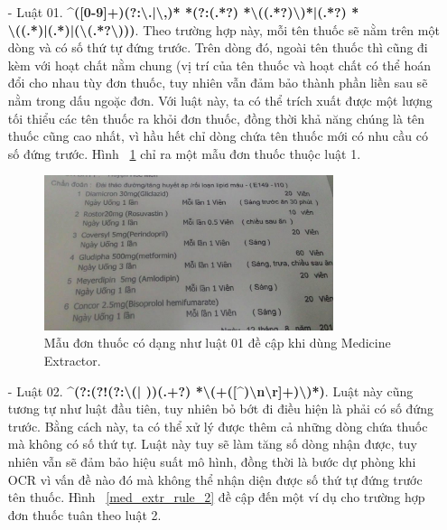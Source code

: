 \begin{itemize}

\item[-] Luật 01. \textbf{^([0-9]+)(?:\textbackslash.|\textbackslash,)* *(?:(.*?) *\textbackslash((.*?)\textbackslash)*|(.*?) *\\\textbackslash((.*)|(.*)|(\textbackslash(.*?\textbackslash)))}. Theo trường hợp này, mỗi tên thuốc sẽ nằm trên một dòng và có số thứ tự đứng trước. Trên dòng đó, ngoài tên thuốc thì cũng đi kèm với hoạt chất nằm chung (vị trí của tên thuốc và hoạt chất có thể hoán đổi cho nhau tùy đơn thuốc, tuy nhiên vẫn đảm bảo thành phần liền sau sẽ nằm trong dấu ngoặc đơn. Với luật này, ta có thể trích xuất được một lượng tối thiểu các tên thuốc ra khỏi đơn thuốc, đồng thời khả năng chúng là tên thuốc cũng cao nhất, vì hầu hết chỉ dòng chứa tên thuốc mới có nhu cầu có số đứng trước. Hình ~\ref{med_extr_rule_1} chỉ ra một mẫu đơn thuốc thuộc luật 1.

\begin{figure}
\centering
\includegraphics[width=0.8\textwidth]{mep_img/med_extr_rule_1.png}
\caption{Mẫu đơn thuốc có dạng như luật 01 đề cập khi dùng Medicine Extractor.}\label{med_extr_rule_1}
\end{figure}

\item[-] Luật 02. \textbf{^(?:(?!(?:\textbackslash(| ))(.+?) *\textbackslash(+([^)\textbackslash n\textbackslash r]+)\textbackslash)*)}. Luật này cũng tương tự như luật đầu tiên, tuy nhiên bỏ bớt đi điều hiện là phải có số đứng trước. Bằng cách này, ta có thể xử lý được thêm cả những dòng chứa thuốc mà không có số thứ tự. Luật này tuy sẽ làm tăng số dòng nhận được, tuy nhiên vẫn sẽ đảm bảo hiệu suất mô hình, đồng thời là bước dự phòng khi OCR vì vấn đề nào đó mà không thể nhận diện được số thứ tự đứng trước tên thuốc. Hình ~\ref{med_extr_rule_2} đề cập đến một ví dụ cho trường hợp đơn thuốc tuân theo luật 2.


\end{itemize}
